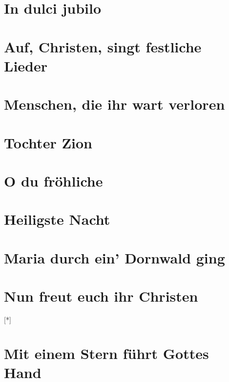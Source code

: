\documentclass[10pt]{article}
\begin{document}
\section{In dulci jubilo}


\section{Auf, Christen, singt festliche Lieder}

\section{Menschen, die ihr wart verloren}

\section{Tochter Zion}

\section{O du fröhliche}

\section{Heiligste Nacht}

\section{Maria durch ein' Dornwald ging}
\section{Nun freut euch ihr Christen}
[*]

\section{Mit einem Stern führt Gottes Hand}
\end{document}
